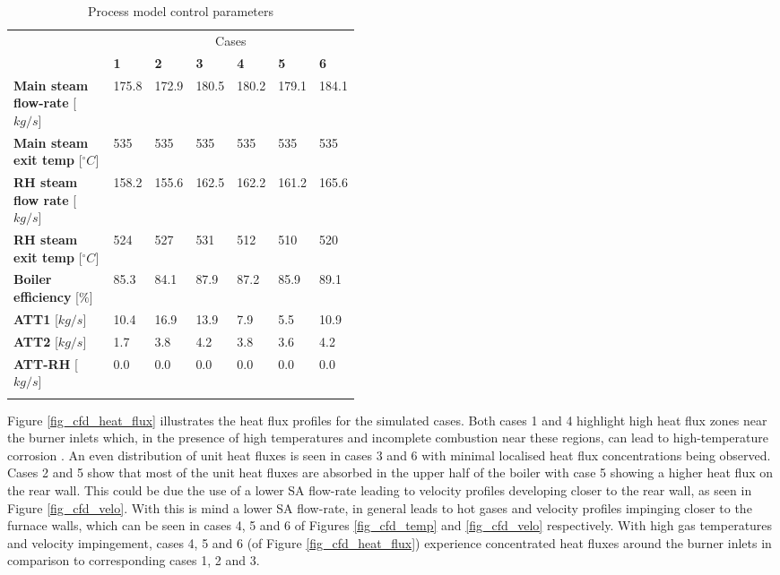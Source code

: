 \documentclass[review]{elsarticle}
\begin{document}
\begin{table}[h!]
\centering
\caption{Process model control parameters}
\vspace{2mm}
{\tabulinesep=1.2mm
\begin{tabularx}{\linewidth}{p{0.45\linewidth} XXXXXX}
\hline
&\multicolumn{6}{c}{Cases}\\
 & \textbf{1} & \textbf{2} & \textbf{3}& \textbf{4}&\textbf{5}&\textbf{6}\\
\hline
\textbf{Main steam flow-rate} 	[$kg/s$]		&175.8&172.9&180.5&180.2&179.1&184.1 \\
\textbf{Main steam exit temp} 	[$^{\circ}C$]	&535& 535 &535&535 &535& 535\\
\textbf{RH steam flow rate} 	[$kg/s$]		&158.2&155.6&162.5&162.2&161.2&165.6\\
\textbf{RH steam exit temp} 	[$^{\circ}C$]	&524&527&531&512&510&520\\
\textbf{Boiler efficiency} 		[$\%$]			&85.3&84.1&87.9	&87.2&85.9&89.1\\
\textbf{ATT1} 		[$kg/s$]					&10.4&16.9&13.9&7.9&5.5&10.9\\
\textbf{ATT2} 		[$kg/s$]					&1.7&3.8&4.2&3.8&3.6&4.2\\
\textbf{ATT-RH} 		[$kg/s$]				&0.0&0.0&0.0&0.0&0.0&0.0\\
\hline
\label{tbl_process_parameters}
\end{tabularx}}
\end{table}

Figure \ref{fig_cfd_heat_flux} illustrates the heat flux profiles for the simulated cases. Both cases 1 and 4 highlight high heat flux zones near the burner inlets which, in the presence of high temperatures and incomplete combustion near these regions, can lead to high-temperature corrosion \cite{Du2017}. An even distribution of unit heat fluxes is seen in cases 3 and 6 with minimal localised heat flux concentrations being observed. Cases 2 and 5 show that most of the unit heat fluxes are absorbed in the upper half of the boiler with case 5 showing a higher heat flux on the rear wall. This could be due the use of a lower SA flow-rate leading to velocity profiles developing closer to the rear wall, as seen in Figure \ref{fig_cfd_velo}. With this is mind a lower SA flow-rate, in general leads to hot gases and velocity profiles impinging closer to the furnace walls, which can be seen in cases 4, 5 and 6 of Figures \ref{fig_cfd_temp} and \ref{fig_cfd_velo} respectively. With high gas temperatures and velocity impingement, cases 4, 5 and 6 (of Figure \ref{fig_cfd_heat_flux}) experience concentrated heat fluxes around the burner inlets in comparison to corresponding cases 1, 2 and 3.
\end{document}
